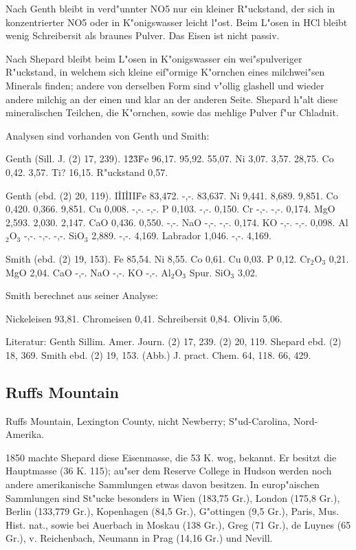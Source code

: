 \documentclass[a4paper, 11pt, oneside]{article}
\begin{document}
Nach Genth bleibt in verd"unnter NO5 nur ein kleiner R"uckstand, der sich in konzentrierter NO5 oder in K"onigswasser leicht l"ost. Beim L"osen in HCl bleibt wenig Schreibersit als braunes Pulver. Das Eisen ist nicht passiv.

Nach Shepard bleibt beim L"osen in K"onigswasser ein wei"spulveriger R"uckstand, in welchem sich kleine eif"ormige K"ornchen eines milchwei"sen Minerals finden; andere von derselben Form sind v"ollig glashell und wieder andere milchig an der einen und klar an der anderen Seite. Shepard h"alt diese mineralischen Teilchen, die K"ornchen, sowie das mehlige Pulver f"ur Chladnit.

Analysen sind vorhanden von Genth und Smith:

Genth (Sill. J. (2) 17, 239).  
1\. 2\. 3\.  
Fe 96,17. 95,92. 55,07.  
Ni 3,07. 3,57. 28,75.  
Co 0,42. 3,57. Ti? 16,15. 
R"uckstand 0,57.

Genth (ebd. (2) 20, 119).
I\. II\. III\.  
Fe 83,472. -,-. 83,637.  
Ni 9,441. 8,689. 9,851.  
Co 0,420. 0,366. 9,851.  
Cu 0,008. -,-. -,-.  
P 0,103. -,-. 0,150.  
Cr -,-. -,-. 0,174.  
MgO 2,593. 2,030. 2,147.  
CaO 0,436. 0,550. -,-.  
NaO -,-. -,-. 0,174.  
KO -,-. -,-. 0,098.  
Al$_{2}$O$_{3}$ -,-. -,-. -,-.  
SiO$_{3}$ 2,889. -,-. 4,169.  
Labrador 1,046. -,-. 4,169.

Smith (ebd. (2) 19, 153).  
Fe 85,54.  
Ni 8,55.  
Co 0,61.  
Cu 0,03.  
P 0,12.  
Cr$_{2}$O$_{3}$ 0,21.  
MgO 2,04.  
CaO -,-.  
NaO -,-.  
KO -,-.  
Al$_{2}$O$_{3}$ Spur.  
SiO$_{3}$ 3,02.  

Smith berechnet aus seiner Analyse:

Nickeleisen 93,81.  
Chromeisen 0,41.  
Schreibersit 0,84.  
Olivin 5,06.

Literatur: Genth Sillim. Amer. Journ. (2) 17, 239. (2) 20, 119. Shepard ebd. (2) 18, 369. Smith ebd. (2) 19, 153. (Abb.) J. pract. Chem. 64, 118. 66, 429.

\subsection{Ruffs Mountain}

Ruffs Mountain, Lexington County, nicht Newberry; S"ud-Carolina, Nord-Amerika.

1850 machte Shepard diese Eisenmasse, die 53 K. wog, bekannt. Er besitzt die Hauptmasse (36 K. 115); au"ser dem Reserve College in Hudson werden noch andere amerikanische Sammlungen etwas davon besitzen. In europ"aischen Sammlungen sind St"ucke besonders in Wien (183,75 Gr.), London (175,8 Gr.), Berlin (133,779 Gr.), Kopenhagen (84,5 Gr.), G"ottingen (9,5 Gr.), Paris, Mus. Hist. nat., sowie bei Auerbach in Moskau (138 Gr.), Greg (71 Gr.), de Luynes (65 Gr.), v. Reichenbach, Neumann in Prag (14,16 Gr.) und Nevill.
\end{document}
